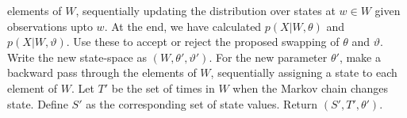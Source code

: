 \begin{algorithm}[H]
\begin{algorithmic}[1]
    elements of $W$, sequentially updating the distribution over states at 
    $w \in W$ given observations upto $w$. At the end, we have calculated
    $p(X|W,\theta)$ and $p(X|W,\vartheta)$. Use these to accept or reject the
    proposed swapping of $\theta$ and $\vartheta$. Write the new state-space
    as $(W,\theta',\vartheta')$.
    \State For the new parameter $\theta'$, make a backward pass through 
    the elements of
    $W$, sequentially assigning a state to each element of $W$.
    \State Let $T'$ be the set of times in $W$ when the Markov chain changes state. Define $S'$ as the corresponding set of state values. Return $(S', T', \theta')$.
\end{algorithmic}
\end{algorithm}

